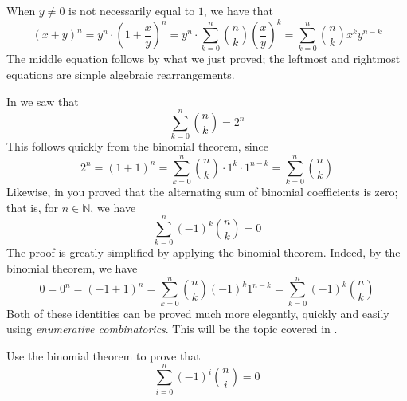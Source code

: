 \begin{cproof}
When $y \ne 0$ is not necessarily equal to $1$, we have that
\[ (x+y)^n = y^n \cdot \left( 1 + \frac{x}{y} \right)^n = y^n \cdot \sum_{k=0}^n \binom{n}{k} \left( \frac{x}{y} \right)^k = \sum_{k=0}^n \binom{n}{k} x^k y^{n-k} \]
The middle equation follows by what we just proved; the leftmost and rightmost equations are simple algebraic rearrangements.
\end{cproof}

\begin{example}
In  we saw that
\[ \sum_{k=0}^n \binom{n}{k} = 2^n \]
This follows quickly from the binomial theorem, since
\[ 2^n = (1+1)^n = \sum_{k=0}^n \binom{n}{k} \cdot 1^k \cdot 1^{n-k} = \sum_{k=0}^n \binom{n}{k} \]
Likewise, in  you proved that the alternating sum of binomial coefficients is zero; that is, for $n \in \mathbb{N}$, we have
\[ \sum_{k=0}^n (-1)^k \binom{n}{k} = 0 \]
The proof is greatly simplified by applying the binomial theorem. Indeed, by the binomial theorem, we have
\[ 0 = 0^n = (-1+1)^n = \sum_{k=0}^n \binom{n}{k}(-1)^k1^{n-k} = \sum_{k=0}^n (-1)^k \binom{n}{k} \]
Both of these identities can be proved much more elegantly, quickly and easily using \textit{enumerative combinatorics}. This will be the topic covered in .
\end{example}

\begin{exercise}
Use the binomial theorem to prove that
\[ \sum_{i=0}^n (-1)^i \binom{n}{i} = 0 \]
\end{exercise}

